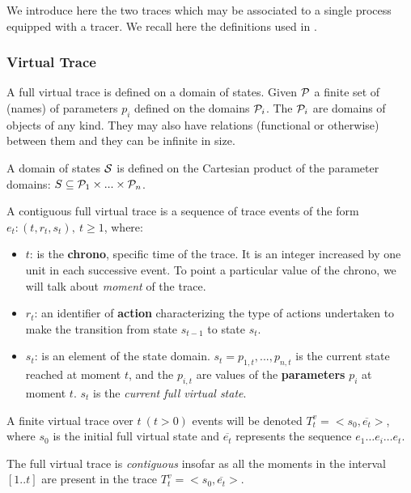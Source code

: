 We introduce here the two traces which may be associated to a single process equipped with a tracer. We recall here the definitions used in \cite{TMTmanuscript}.




\subsubsection{Virtual Trace}

A full virtual trace is defined on a domain of states. Given ${\cal P}$  a finite set of (names) of parameters $ p_i $  defined on the domains ${\cal P}_i$.
The ${\cal P}_i$ are domains of objects of any kind. They may also have relations (functional or otherwise) between them and they can be infinite in size.

A domain of states ${\cal S}$  is defined on the Cartesian product of the parameter domains: $S \subseteq {\cal P}_{1}\times ...\times {\cal P}_{n}$.


\begin{definition} 

A contiguous full virtual trace  is a sequence of trace events of the form {\bf $e_t: (t, r_t, s_t),\ t \ge 1$}, where:
\begin{itemize}
  \item $t$: is the {\bf chrono}, specific time of the trace. It is an integer increased by one unit in each successive event. To point a particular value of the chrono, we will talk about {\em moment} of the trace.
   \item $r_t$: an identifier of {\bf action} characterizing the type of actions undertaken to make the transition from state $s_{t-1}$ to state $s_t$.
   \item $s_t$: is an element of the state domain. $s_t = p_{1, t}, ..., p_{n, t}$ is the current state reached
at moment $t$, and the $p_{i, t}$ are values of the {\bf parameters} $p_i$ at moment $t$.
$s_t$ is the {\em current full virtual state}.
\end{itemize}
\end{definition}
A finite virtual trace over $t\ (t > 0)$ events will be denoted $T^v_t = <s_0, \overline{e_t}>$, where $s_0$ is the initial full virtual state and $\overline{e_t}$ represents the sequence $e_1 \ldots e_i \ldots e_t $.



The full virtual trace is {\em contiguous} insofar as all the moments in the interval $[1..t]$ are present in the trace $T^v_t = <s_0, \overline{e_t}>$.


